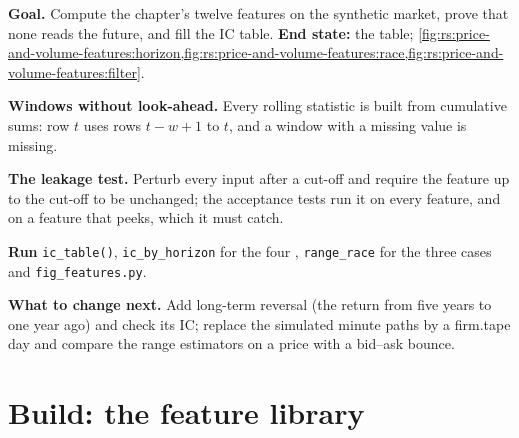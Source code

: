 \begin{tutorial}
\textbf{Goal.} Compute the chapter's twelve features on the synthetic market, prove that none reads the future, and fill the IC table.
\textbf{End state:} the table; \cref{fig:rs:price-and-volume-features:horizon,fig:rs:price-and-volume-features:race,fig:rs:price-and-volume-features:filter}.
\begin{tutsteps}
\item \textbf{Windows without look-ahead.} Every rolling statistic is built from cumulative sums: row $t$ uses rows $t - w + 1$ to $t$,
and a window with a missing value is missing.
\label{lst:rs:price-and-volume-features:rolling}
\item \textbf{The leakage test.} Perturb every input after a cut-off and require the feature up to the cut-off to be unchanged; the
acceptance tests run it on every feature, and on a feature that peeks, which it must catch.
\label{lst:rs:price-and-volume-features:leak}
\item \textbf{Run} \texttt{ic\_table()}, \texttt{ic\_by\_horizon} for the four , \texttt{range\_race} for the three cases
and \texttt{fig\_features.py}.
\end{tutsteps}
\textbf{What to change next.} Add long-term reversal (the return from five years to one year ago) and check its IC; replace the
simulated minute paths by a firm.tape day and compare the range estimators on a price with a bid--ask bounce.
\end{tutorial}

\section{Build: the feature library}\label{bld:rs:price-and-volume-features:features}

